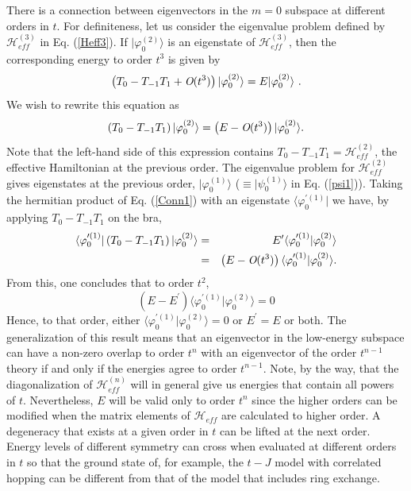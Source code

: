 \documentclass[floatfix,twocolumn,aps,prb,showpacs,superscriptaddress]{revtex4}
\begin{document}
There is a connection between eigenvectors in the $m=0$ subspace at
different orders in $t$. For definiteness, let us consider the eigenvalue
problem defined by $\mathcal{H}_{eff}^{(3)}$ in Eq. (\ref{Heff3}). If $%
|\varphi _{0}^{(2)}\rangle $ is an eigenstate of $\mathcal{H}_{eff}^{(3)}$,
then the corresponding energy to order $t^{3}$ is given by
\begin{equation}
\left( T_{0}-T_{-1}T_{1}+\emph{O}(t^{3})\right) |\varphi _{0}^{(2)}\rangle
=E|\varphi _{0}^{(2)}\rangle \ .
\end{equation}%
We wish to rewrite this equation as
\begin{equation}
\left( T_{0}-T_{-1}T_{1}\right) |\varphi _{0}^{(2)}\rangle =\left( E-\emph{O}%
(t^{3})\right) |\varphi _{0}^{(2)}\rangle .  \label{Conn1}
\end{equation}%
Note that the left-hand side of this expression contains $T_{0}-T_{-1}T_{1}=%
\mathcal{H}_{eff}^{(2)}$, the effective Hamiltonian at the previous order.
The eigenvalue problem for $\mathcal{H}_{eff}^{(2)}$ gives eigenstates at
the previous order, $|\varphi _{0}^{(1)}\rangle $ ($\equiv |\psi
_{0}^{(1)}\rangle $ in Eq. (\ref{psi1})). Taking the hermitian product of
Eq. (\ref{Conn1}) with an eigenstate $\langle \varphi _{0}^{\prime (1)}|$ we
have, by applying $T_{0}-T_{-1}T_{1}$ on the bra,
\begin{eqnarray}
\langle \varphi _{0}^{\prime (1)}|\left( T_{0}-T_{-1}T_{1}\right) |\varphi
_{0}^{(2)}\rangle &=&E^{\prime }\langle \varphi _{0}^{\prime (1)}|\varphi
_{0}^{(2)}\rangle \\
&=&\left( E-\emph{O}(t^{3})\right) \langle \varphi _{0}^{\prime (1)}|\varphi
_{0}^{(2)}\rangle .  \nonumber
\end{eqnarray}%
From this, one concludes that to order $t^{2}$,
\begin{equation}
\left( E-E^{\prime }\right) \langle \varphi _{0}^{\prime (1)}|\varphi
_{0}^{(2)}\rangle =0
\end{equation}%
Hence, to that order, either $\langle \varphi _{0}^{\prime (1)}|\varphi
_{0}^{(2)}\rangle =0$ or $E^{\prime }=E$ or both. The generalization of this
result means that an eigenvector in the low-energy subspace can have a
non-zero overlap to order $t^{n}$ with an eigenvector of the order $t^{n-1}$
theory if and only if the energies agree to order $t^{n-1}$. Note, by the
way, that the diagonalization of $\mathcal{H}_{eff}^{(n)}$ will in general
give us energies that contain all powers of $t$. Nevertheless, $E$ will be
valid only to order $t^{n}$ since the higher orders can be modified when the
matrix elements of $\mathcal{H}_{eff}$ are calculated to higher order. A
degeneracy that exists at a given order in $t$ can be lifted at the next
order. Energy levels of different symmetry can cross when evaluated at
different orders in $t$ so that the ground state of, for example, the $t-J$
model with correlated hopping 
can be different from that of the model that includes ring exchange.
\end{document}
